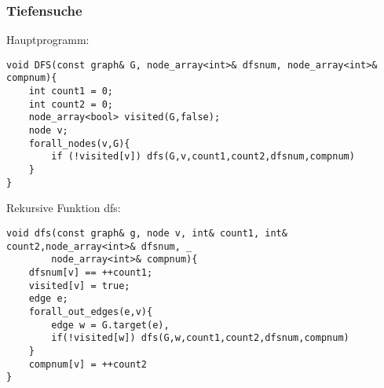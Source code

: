 \documentclass[a4paper]{article}
\begin{document}
\subsubsection*{Tiefensuche}
Hauptprogramm:
\begin{lstlisting}
void DFS(const graph& G, node_array<int>& dfsnum, node_array<int>& compnum){
	int count1 = 0;
	int count2 = 0;
	node_array<bool> visited(G,false);
	node v;
	forall_nodes(v,G){
		if (!visited[v]) dfs(G,v,count1,count2,dfsnum,compnum)
	}
}
\end{lstlisting}
Rekursive Funktion dfs:
\begin{lstlisting}
void dfs(const graph& g, node v, int& count1, int& count2,node_array<int>& dfsnum, _
		node_array<int>& compnum){
	dfsnum[v] == ++count1;
	visited[v] = true;
	edge e;
	forall_out_edges(e,v){
		edge w = G.target(e),
		if(!visited[w]) dfs(G,w,count1,count2,dfsnum,compnum)
	}
	compnum[v] = ++count2
}
\end{lstlisting}
\end{document}
